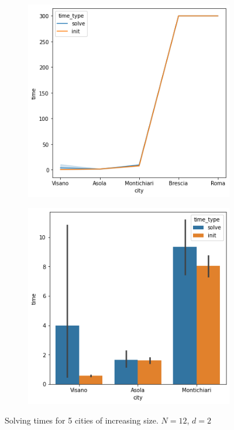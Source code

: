 \documentclass[10pt]{article}
\begin{document}
	\begin{figure}
		\centering
		\begin{subfigure}[c]{.49\textwidth}
			\centering
			\includegraphics[width=\textwidth]{city-increasing-size.png}
			\caption{}
		\end{subfigure}
		\begin{subfigure}[c]{.49\textwidth}
			\includegraphics[width=\textwidth]{city-increasing-size-2.png}
			\caption{}
		\end{subfigure}

		\caption{Solving times for 5 cities of increasing size. $N = 12$, $d=2$}
		\label{fig:city-increasing-size}
	\end{figure}
\end{document}

